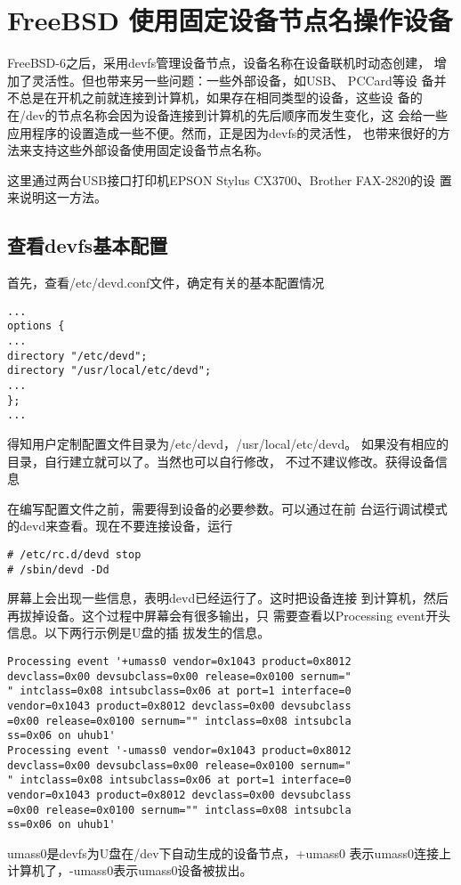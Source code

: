 \chapter{FreeBSD 使用固定设备节点名操作设备}

FreeBSD-6之后，采用devfs管理设备节点，设备名称在设备联机时动态创建，
增加了灵活性。但也带来另一些问题：一些外部设备，如USB、 PCCard等设
备并不总是在开机之前就连接到计算机，如果存在相同类型的设备，这些设
备的在/dev的节点名称会因为设备连接到计算机的先后顺序而发生变化，这
会给一些应用程序的设置造成一些不便。然而，正是因为devfs的灵活性，
也带来很好的方法来支持这些外部设备使用固定设备节点名称。

这里通过两台USB接口打印机EPSON Stylus CX3700、Brother FAX-2820的设
置来说明这一方法。

\section{查看devfs基本配置}

首先，查看/etc/devd.conf文件，确定有关的基本配置情况
\begin{lstlisting}
...
options {
...
directory "/etc/devd";
directory "/usr/local/etc/devd";
...
};
...
\end{lstlisting}
得知用户定制配置文件目录为/etc/devd，/usr/local/etc/devd。
如果没有相应的目录，自行建立就可以了。当然也可以自行修改，
不过不建议修改。获得设备信息

在编写配置文件之前，需要得到设备的必要参数。可以通过在前
台运行调试模式的devd来查看。现在不要连接设备，运行
\begin{lstlisting}
# /etc/rc.d/devd stop
# /sbin/devd -Dd
\end{lstlisting}
屏幕上会出现一些信息，表明devd已经运行了。这时把设备连接
到计算机，然后再拔掉设备。这个过程中屏幕会有很多输出，只
需要查看以Processing event开头信息。以下两行示例是U盘的插
拔发生的信息。
\begin{lstlisting}
Processing event '+umass0 vendor=0x1043 product=0x8012
devclass=0x00 devsubclass=0x00 release=0x0100 sernum="
" intclass=0x08 intsubclass=0x06 at port=1 interface=0
vendor=0x1043 product=0x8012 devclass=0x00 devsubclass
=0x00 release=0x0100 sernum="" intclass=0x08 intsubcla
ss=0x06 on uhub1'
Processing event '-umass0 vendor=0x1043 product=0x8012
devclass=0x00 devsubclass=0x00 release=0x0100 sernum="
" intclass=0x08 intsubclass=0x06 at port=1 interface=0 
vendor=0x1043 product=0x8012 devclass=0x00 devsubclass
=0x00 release=0x0100 sernum="" intclass=0x08 intsubcla
ss=0x06 on uhub1'
\end{lstlisting}
umass0是devfs为U盘在/dev下自动生成的设备节点，+umass0
表示umass0连接上计算机了，-umass0表示umass0设备被拔出。

